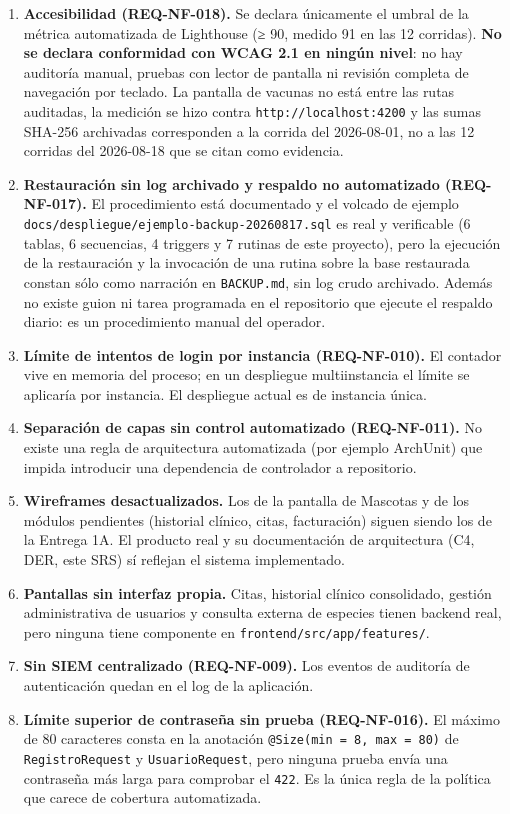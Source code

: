 \documentclass[
  spanish,
]{article}
\begin{document}
\begin{enumerate}
  uso por crear.
\item
  \textbf{Accesibilidad (REQ-NF-018).} Se declara únicamente el umbral
  de la métrica automatizada de Lighthouse (≥ 90, medido 91 en las 12
  corridas). \textbf{No se declara conformidad con WCAG 2.1 en ningún
  nivel}: no hay auditoría manual, pruebas con lector de pantalla ni
  revisión completa de navegación por teclado. La pantalla de vacunas no
  está entre las rutas auditadas, la medición se hizo contra
  \texttt{http:/\allowbreak{}/\allowbreak{}localhost:4200} y las sumas SHA-256 archivadas
  corresponden a la corrida del 2026-08-01, no a las 12 corridas del
  2026-08-18 que se citan como evidencia.
\item
  \textbf{Restauración sin log archivado y respaldo no automatizado
  (REQ-NF-017).} El procedimiento está documentado y el volcado de
  ejemplo \texttt{docs/\allowbreak{}despliegue/\allowbreak{}ejemplo-\allowbreak{}backup-\allowbreak{}20260817.\allowbreak{}sql} es real y
  verificable (6 tablas, 6 secuencias, 4 triggers y 7 rutinas de este
  proyecto), pero la ejecución de la restauración y la invocación de una
  rutina sobre la base restaurada constan sólo como narración en
  \texttt{BACKUP.\allowbreak{}md}, sin log crudo archivado. Además no existe guion ni
  tarea programada en el repositorio que ejecute el respaldo diario: es
  un procedimiento manual del operador.
\item
  \textbf{Límite de intentos de login por instancia (REQ-NF-010).} El
  contador vive en memoria del proceso; en un despliegue multiinstancia
  el límite se aplicaría por instancia. El despliegue actual es de
  instancia única.
\item
  \textbf{Separación de capas sin control automatizado (REQ-NF-011).} No
  existe una regla de arquitectura automatizada (por ejemplo ArchUnit)
  que impida introducir una dependencia de controlador a repositorio.
\item
  \textbf{Wireframes desactualizados.} Los de la pantalla de Mascotas y
  de los módulos pendientes (historial clínico, citas, facturación)
  siguen siendo los de la Entrega 1A. El producto real y su
  documentación de arquitectura (C4, DER, este SRS) sí reflejan el
  sistema implementado.
\item
  \textbf{Pantallas sin interfaz propia.} Citas, historial clínico
  consolidado, gestión administrativa de usuarios y consulta externa de
  especies tienen backend real, pero ninguna tiene componente en
  \texttt{frontend/\allowbreak{}src/\allowbreak{}app/\allowbreak{}features/}.
\item
  \textbf{Sin SIEM centralizado (REQ-NF-009).} Los eventos de auditoría
  de autenticación quedan en el log de la aplicación.
\item
  \textbf{Límite superior de contraseña sin prueba (REQ-NF-016).} El
  máximo de 80 caracteres consta en la anotación
  \texttt{@Size(min\ =\ 8,\allowbreak{}\ max\ =\ 80)} de \texttt{Registro\allowbreak{}Request} y
  \texttt{Usuario\allowbreak{}Request}, pero ninguna prueba envía una contraseña más
  larga para comprobar el \texttt{422}. Es la única regla de la política
  que carece de cobertura automatizada.
\end{enumerate}
\end{document}
